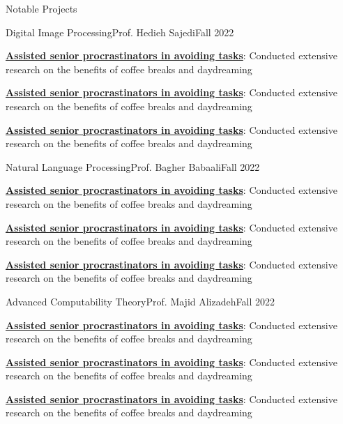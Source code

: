\documentclass[]{main}
\begin{document}
\begin{section}{Notable Projects}
 \begin{subsection}{Digital Image Processing}{Prof. Hedieh Sajedi}{Fall 2022}{}
     \item \textbf{\href{https://google.com}{Assisted senior procrastinators in avoiding tasks}}: Conducted extensive research on the benefits of coffee breaks and daydreaming
     \item \textbf{\href{https://google.com}{Assisted senior procrastinators in avoiding tasks}}: Conducted extensive research on the benefits of coffee breaks and daydreaming
     \item \textbf{\href{https://google.com}{Assisted senior procrastinators in avoiding tasks}}: Conducted extensive research on the benefits of coffee breaks and daydreaming
 \end{subsection}

 \begin{subsection}{Natural Language Processing}{Prof. Bagher Babaali}{Fall 2022}{}
     \item \textbf{\href{https://google.com}{Assisted senior procrastinators in avoiding tasks}}: Conducted extensive research on the benefits of coffee breaks and daydreaming
     \item \textbf{\href{https://google.com}{Assisted senior procrastinators in avoiding tasks}}: Conducted extensive research on the benefits of coffee breaks and daydreaming
     \item \textbf{\href{https://google.com}{Assisted senior procrastinators in avoiding tasks}}: Conducted extensive research on the benefits of coffee breaks and daydreaming
 \end{subsection}

 \begin{subsection}{Advanced Computability Theory}{Prof. Majid Alizadeh}{Fall 2022}{}
     \item \textbf{\href{https://google.com}{Assisted senior procrastinators in avoiding tasks}}: Conducted extensive research on the benefits of coffee breaks and daydreaming
     \item \textbf{\href{https://google.com}{Assisted senior procrastinators in avoiding tasks}}: Conducted extensive research on the benefits of coffee breaks and daydreaming
     \item \textbf{\href{https://google.com}{Assisted senior procrastinators in avoiding tasks}}: Conducted extensive research on the benefits of coffee breaks and daydreaming
 \end{subsection}


\end{section}
\end{document}
